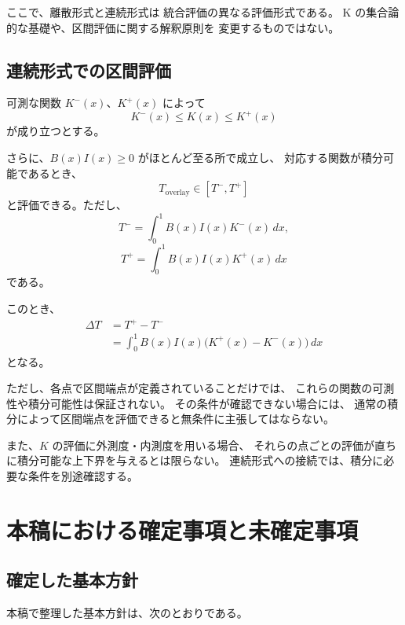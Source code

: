 \documentclass[a4paper,12pt]{article}
\begin{document}
ここで、離散形式と連続形式は
統合評価の異なる評価形式である。
K の集合論的な基礎や、区間評価に関する解釈原則を
変更するものではない。

\subsection{連続形式での区間評価}

可測な関数 $K^-(x)$、$K^+(x)$ によって
\[
    K^-(x)\leq K(x)\leq K^+(x)
\]
が成り立つとする。

さらに、$B(x)I(x)\geq0$ がほとんど至る所で成立し、
対応する関数が積分可能であるとき、
\[
    T_{\mathrm{overlay}}
    \in[T^-,T^+]
\]
と評価できる。ただし、
\[
    T^-=
    \int_0^1B(x)I(x)K^-(x)\,dx,
\]
\[
    T^+=
    \int_0^1B(x)I(x)K^+(x)\,dx
\]
である。

このとき、
\[
\begin{aligned}
    \Delta T
    &=T^+-T^-\\
    &=\int_0^1
      B(x)I(x)\bigl(K^+(x)-K^-(x)\bigr)\,dx
\end{aligned}
\]
となる。

ただし、各点で区間端点が定義されていることだけでは、
これらの関数の可測性や積分可能性は保証されない。
その条件が確認できない場合には、
通常の積分によって区間端点を評価できると無条件に主張してはならない。

また、$K$ の評価に外測度・内測度を用いる場合、
それらの点ごとの評価が直ちに積分可能な上下界を与えるとは限らない。
連続形式への接続では、積分に必要な条件を別途確認する。

\section{本稿における確定事項と未確定事項}

\subsection{確定した基本方針}

本稿で整理した基本方針は、次のとおりである。
\end{document}
